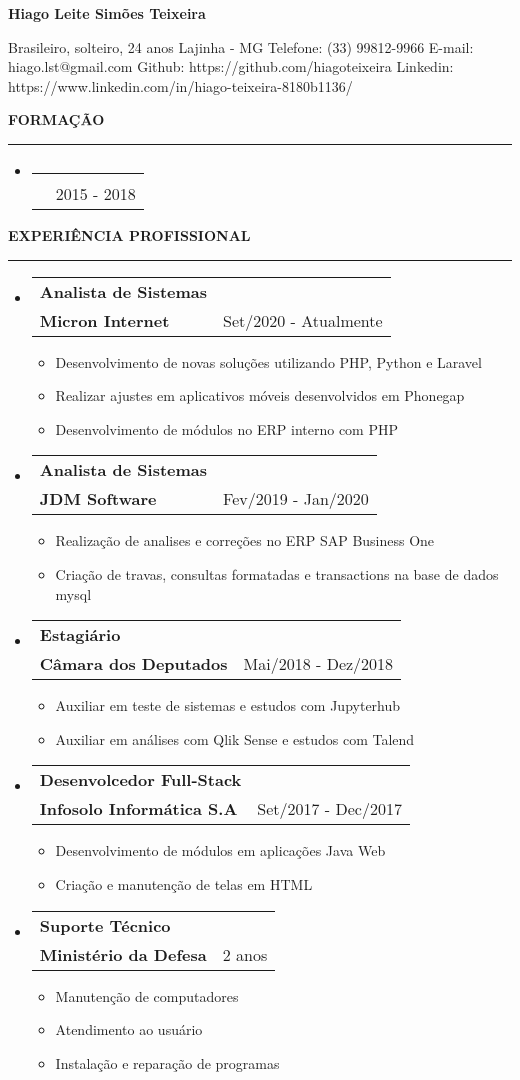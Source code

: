 \documentclass[a4paper,10pt]{article}
\makeatletter
\newcommand{\EducationItem}[3]{
    \item
    \begin{tabular*}{0.93\textwidth}[t]{l@{\extracolsep{\fill}}r}
        \normalfont{#1} & \\
        \small\normalfont{#2} & \scriptsize#3
    \end{tabular*}
}
\newcommand{\WorkExpItem}[3]{
    \item
        \begin{tabular*}{0.93\textwidth}[t]{l@{\extracolsep{\fill}}r}
            \textbf{#1} & \\
            \small\textbf{#2} & \scriptsize#3 \\
        \end{tabular*}
}
\newcommand{\WorkExpActivitiesBegin}[0]{
    \vspace{-5pt}\begin{itemize}
}
\newcommand{\WorkExpActivitiesItem}[1]{
    \vspace{-2pt}\item[]\small #1
}
\newcommand{\WorkExpActivitiesEnd}[0]{
    \end{itemize}\vspace{-7pt}
}
\newcommand{\SectionTitle}[1]{
    \begin{flushleft}
    \textbf{#1}
    \noindent\textcolor{gray}{\rule{18.5cm}{1px}}
    \end{flushleft}
}
\newcommand{\SectionBegin}[0]{
    \vspace{-16pt}\begin{flushleft}
    \begin{itemize}
}
\newcommand{\SectionEnd}[0]{
    \end{itemize}
    \end{flushleft}\vspace{-2pt}
}
\newcommand{\PersonInformation}[7]{
    \begin{flushleft}
        \begin{LARGE}
            \textbf{#1}
        \end{LARGE}
    \end{flushleft}

    \begin{flushleft}
        #2
        \newline
        #3
        \newline
        Telefone: #4
        \newline
        E-mail: #5
        \newline
        Github: #6
        \newline
        Linkedin: #7
        \newline
    \end{flushleft}
}
\makeatother
\begin{document}

\PersonInformation
    {Hiago Leite Simões Teixeira}
    {Brasileiro, solteiro, 24 anos}
    {Lajinha - MG}
    {(33) 99812-9966}
    {hiago.lst@gmail.com}
    {https://github.com/hiagoteixeira}
    {https://www.linkedin.com/in/hiago-teixeira-8180b1136/}

\SectionTitle
    {FORMA\c{C}\~{A}O}
\SectionBegin
    \EducationItem
        {Bacharel em Ciência da Computação}
        {Centro Universitário de Brasília - UniCEUB}
        {2015 - 2018}
\SectionEnd

\SectionTitle
    {EXPERI\^{E}NCIA PROFISSIONAL}
\SectionBegin
    \WorkExpItem
        {Analista de Sistemas}
        {Micron Internet}
        {Set/2020 - Atualmente}
        \WorkExpActivitiesBegin
            \WorkExpActivitiesItem{Desenvolvimento de novas solu\c{c}\~{o}es utilizando PHP, Python e Laravel}
            \WorkExpActivitiesItem{Realizar ajustes em aplicativos móveis desenvolvidos em Phonegap}
            \WorkExpActivitiesItem{Desenvolvimento de módulos no ERP interno com PHP}
        \WorkExpActivitiesEnd
    \WorkExpItem
        {Analista de Sistemas}
        {JDM Software}
        {Fev/2019 - Jan/2020}
        \WorkExpActivitiesBegin
            \WorkExpActivitiesItem{Realiza\c{c}\~{a}o de analises e corre\c{c}\~{o}es no ERP SAP Business One}
            \WorkExpActivitiesItem{Cria\c{c}\~{a}o de travas, consultas formatadas e transactions na base de dados mysql}
        \WorkExpActivitiesEnd
    \WorkExpItem
        {Estagiário}
        {C\^{a}mara dos Deputados}
        {Mai/2018 - Dez/2018}
        \WorkExpActivitiesBegin
            \WorkExpActivitiesItem{Auxiliar em teste de sistemas e estudos com Jupyterhub}
            \WorkExpActivitiesItem{Auxiliar em análises com Qlik Sense e estudos com Talend}
        \WorkExpActivitiesEnd
    \WorkExpItem
        {Desenvolcedor Full-Stack}
        {Infosolo Informática S.A}
        {Set/2017 - Dec/2017}
        \WorkExpActivitiesBegin
            \WorkExpActivitiesItem{Desenvolvimento de módulos em aplicações Java Web}
            \WorkExpActivitiesItem{Criação e manutenção de telas em HTML}
        \WorkExpActivitiesEnd
    \WorkExpItem
        {Suporte Técnico}
        {Ministério da Defesa}
        {2 anos}
        \WorkExpActivitiesBegin
            \WorkExpActivitiesItem{Manutenção de computadores}
            \WorkExpActivitiesItem{Atendimento ao usuário}
            \WorkExpActivitiesItem{Instalação e reparação de programas}
        \WorkExpActivitiesEnd
\SectionEnd
\end{document}
